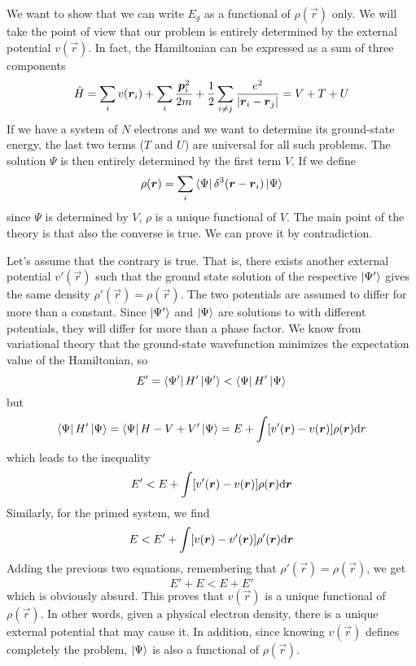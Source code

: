 We want to show that we can write $E_g$ as a functional of $\rho(\vec{r})$ only. We will take the point of view that our problem is entirely determined by the external potential $v(\vec{r})$. In fact, the Hamiltonian can be expressed as a sum of three components
\begin{equation} \label{eq:hamiltonian_DFT}
    \hat{H} = \sum_i v(\mathbf{\boldsymbol{r}}_i) + \sum_i \frac{\mathbf{\boldsymbol{p}}_i^2}{2m} + \frac{1}{2} \sum_{i\neq j} \frac{e^2}{|\mathbf{\boldsymbol{r}}_i - \mathbf{\boldsymbol{r}}_j|} = V + T + U
\end{equation}
If we have a system of $N$ electrons and we want to determine its ground-state energy, the last two terms ($T$ and $U$) are universal for all such problems. The solution $\Psi$ is then entirely determined by the first term $V$. If we define
\begin{equation}
    \rho(\mathbf{\boldsymbol{r}}) = \sum_i \bra{\Psi} \delta^3(\mathbf{\boldsymbol{r}}-\mathbf{\boldsymbol{r}}_i)\ket{\Psi}
\end{equation}
since $\Psi$ is determined by $V$, $\rho$ is a unique functional of $V$. The main point of the theory is that also the converse is true. We can prove it by contradiction.

Let's assume that the contrary is true. That is, there exists another external potential $v'(\vec{r})$ such that the ground state solution of the respective \sche $\ket{\Psi'}$ gives the same density $\rho'(\vec{r}) = \rho(\vec{r})$. The two potentials are assumed to differ for more than a constant. Since $\ket{\Psi'}$ and $\ket{\Psi}$ are solutions to \sches with different potentials, they will differ for more than a phase factor. We know from variational theory that the ground-state wavefunction minimizes the expectation value of the Hamiltonian, so
\begin{equation}
    E' = \bra{\Psi'} H' \ket{\Psi'} < \bra{\Psi} H' \ket{\Psi}
\end{equation}
but
\begin{equation}
    \bra{\Psi} H' \ket{\Psi} = \bra{\Psi} H - V + V' \ket{\Psi} = E + \int [v'(\vec{r}) - v(\vec{r})] \rho(\vec{r}) \differential r
\end{equation}
which leads to the inequality
\begin{equation}
    E' < E + \int [v'(\vec{r}) - v(\vec{r})] \rho(\vec{r}) \differential \vec{r}
\end{equation}
Similarly, for the primed system, we find
\begin{equation}
    E < E' + \int [v(\vec{r}) - v'(\vec{r})] \rho'(\vec{r}) \differential \vec{r}
\end{equation}
Adding the previous two equations, remembering that $\rho'(\vec{r}) = \rho(\vec{r})$, we get
\begin{equation}
    E' + E < E + E'
\end{equation}
which is obviously absurd. This proves that $v(\vec{r})$ is a unique functional of $\rho(\vec{r})$. In other words, given a physical electron density, there is a unique external potential that may cause it. In addition, since knowing $v(\vec{r})$ defines completely the problem, $\ket{\Psi}$ is also a functional of $\rho(\vec{r})$.

